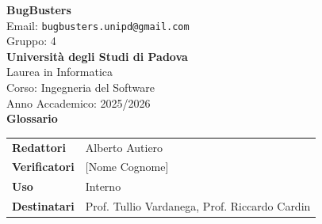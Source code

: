 \documentclass[a4paper,11pt]{article}
\begin{document}
\pagestyle{fancy}
\fancyhf{}
\fancyfoot[R]{\nouppercase{\rightmark}}
\renewcommand{\headrulewidth}{0pt}
\renewcommand{\footrulewidth}{0pt}

\begin{center}
  \thispagestyle{empty}
  {\Large\bfseries BugBusters}\\[0.3cm]
  {\small\color{darkgray} Email: \texttt{bugbusters.unipd@gmail.com}} \\[0.1cm]
  {\small\color{darkgray} Gruppo: 4} \\[0.5cm]

  {\large\bfseries Università degli Studi di Padova}\\[0.3cm]
  {\small Laurea in Informatica}\\[0.2cm]
  {\small Corso: Ingegneria del Software}\\[0.2cm]
  {\small Anno Accademico: 2025/2026}\\[0.8cm]

  {\Huge\bfseries Glossario}\\[0.8cm]
\end{center}

\begin{center}
\begin{tcolorbox}[colback=lightgray,width=0.85\textwidth,arc=3mm,boxrule=0.5pt]
\begin{tabular}{@{}ll@{}}
\textbf{Redattori}    & Alberto Autiero \\
\textbf{Verificatori} & [Nome Cognome] \\
\textbf{Uso}          & Interno \\
\textbf{Destinatari}  & Prof. Tullio Vardanega, Prof. Riccardo Cardin \\
\end{tabular}
\end{tcolorbox}
\end{center}
\end{document}
